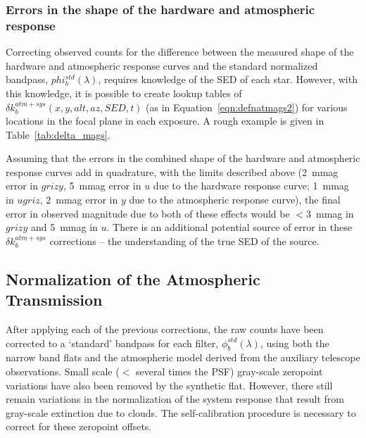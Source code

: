 \documentclass[12pt,preprint]{aastex}
\begin{document}
\subsubsection{Errors in the shape of the hardware and atmospheric response}
\label{sec:apply_deltak}

Correcting observed counts for the difference between the measured
shape of the hardware and atmospheric response curves and the standard
normalized bandpass, $phi_b^{std}(\lambda)$, requires knowledge of the
SED of each star. However, with this knowledge, it is possible to
create lookup tables of $\delta k_b^{atm+sys}(x,y,alt,az,SED,t)$ (as
in Equation~\ref{eqn:defnatmags2}) for various locations in the focal
plane in each exposure. A rough example is given in
Table~\ref{tab:delta_mags}.

Assuming that the errors in the combined shape of the hardware and atmospheric
response curves add in quadrature, with the limits described above (2~mmag error
in $grizy$,  5~mmag error in $u$ due to the hardware response curve; 
1~mmag in $ugriz$, 2~mmag error in $y$ due to the atmospheric response curve), 
the final error in observed magnitude due to both of these effects would be $<3$~mmag
in $grizy$ and 5~mmag in $u$. There is an additional potential source of error in these
$\delta k_b^{atm+sys}$ corrections -- the understanding of the true SED of the 
source. 


\subsection{Normalization of the Atmospheric Transmission}
\label{sec:selfcalib}

After applying each of the previous corrections, the raw counts have been
corrected to a `standard' bandpass for each filter,
$\phi_b^{std}(\lambda)$, using both the narrow band flats and the
atmospheric model derived from the auxiliary telescope
observations. Small scale ($<$ several times the PSF) gray-scale
zeropoint variations have also been removed by the synthetic
flat. However, there still remain variations in the normalization of the
system response that result from gray-scale extinction due to
clouds. The self-calibration procedure is necessary to correct for
these zeropoint offsets.
\end{document}
